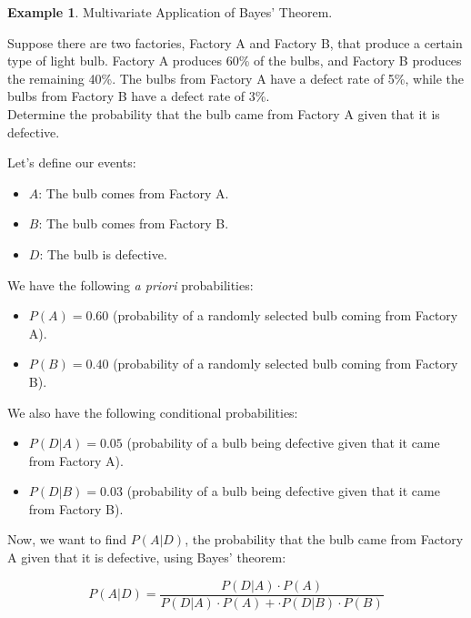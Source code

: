 \documentclass[12pt]{book}
\theoremstyle{definition}
\newtheorem{exmp}{Example}[chapter]
\begin{document}
\begin{tcolorbox}
\begin{exmp}{Multivariate Application of Bayes' Theorem.}

Suppose there are two factories, Factory A and Factory B, that produce a certain type of light bulb. Factory A produces 60\% of the bulbs, and Factory B produces the remaining 40\%. The bulbs from Factory A have a defect rate of 5\%, while the bulbs from Factory B have a defect rate of 3\%.\\

Determine the probability that the bulb came from Factory A given that it is defective.
\end{exmp}
\end{tcolorbox}

Let's define our events:
\begin{itemize}
    \item \(A\): The bulb comes from Factory A.
    \item \(B\): The bulb comes from Factory B.
    \item \(D\): The bulb is defective.
\end{itemize}

\bigskip

We have the following \emph{a priori} probabilities:
\begin{itemize}
    \item \(P(A) = 0.60\) (probability of a randomly selected bulb coming from Factory A).
    \item \(P(B) = 0.40\) (probability of a randomly selected bulb coming from Factory B).
\end{itemize}

\bigskip 

We also have the following conditional probabilities:
\begin{itemize}
    \item \(P(D | A) = 0.05\) (probability of a bulb being defective given that it came from Factory A).
    \item \(P(D | B) = 0.03\) (probability of a bulb being defective given that it came from Factory B).
\end{itemize}

Now, we want to find \(P(A | D)\), the probability that the bulb came from Factory A given that it is defective, using Bayes' theorem:

\[
P(A | D) = \frac{P(D | A) \cdot P(A)}{P(D | A) \cdot P(A) + \cdot P(D | B) \cdot P(B)}
\]
\end{document}
